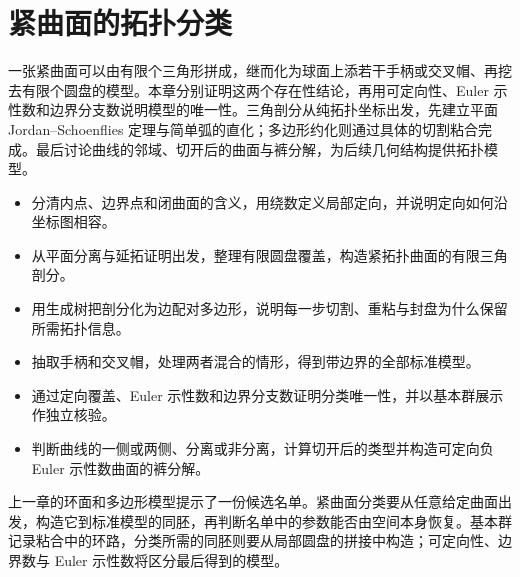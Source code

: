 
% 
% 

\chapter{紧曲面的拓扑分类}
\label{g1:ch:06}

\begin{chapterabstract}
	一张紧曲面可以由有限个三角形拼成，继而化为球面上添若干手柄或交叉帽、再挖去有限个圆盘的模型。本章分别证明这两个存在性结论，再用可定向性、Euler 示性数和边界分支数说明模型的唯一性。三角剖分从纯拓扑坐标出发，先建立平面 Jordan--Schoenflies 定理与简单弧的直化；多边形约化则通过具体的切割粘合完成。最后讨论曲线的邻域、切开后的曲面与裤分解，为后续几何结构提供拓扑模型。
\end{chapterabstract}

\begin{learninggoals}
	\begin{itemize}
		\item 分清内点、边界点和闭曲面的含义，用绕数定义局部定向，并说明定向如何沿坐标图相容。
		\item 从平面分离与延拓证明出发，整理有限圆盘覆盖，构造紧拓扑曲面的有限三角剖分。
		\item 用生成树把剖分化为边配对多边形，说明每一步切割、重粘与封盘为什么保留所需拓扑信息。
		\item 抽取手柄和交叉帽，处理两者混合的情形，得到带边界的全部标准模型。
		\item 通过定向覆盖、Euler 示性数和边界分支数证明分类唯一性，并以基本群展示作独立核验。
		\item 判断曲线的一侧或两侧、分离或非分离，计算切开后的类型并构造可定向负 Euler 示性数曲面的裤分解。
	\end{itemize}
\end{learninggoals}

上一章的环面和多边形模型提示了一份候选名单。紧曲面分类要从任意给定曲面出发，构造它到标准模型的同胚，再判断名单中的参数能否由空间本身恢复。基本群记录粘合中的环路，分类所需的同胚则要从局部圆盘的拼接中构造；可定向性、边界数与 Euler 示性数将区分最后得到的模型。

\ProseParagraphBreak

